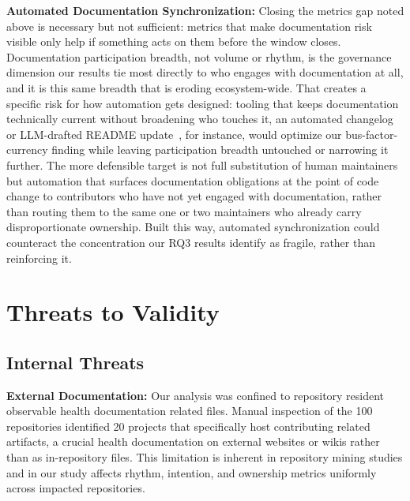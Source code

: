 \documentclass[10pt,conference]{IEEEtran}
\begin{document}
{{\noindent \textbf{Automated Documentation Synchronization:} Closing the metrics gap noted above is necessary but not sufficient: metrics that make documentation risk visible only help if something acts on them before the window closes. Documentation participation breadth, not volume or rhythm, is the governance dimension our results tie most directly to who engages with documentation at all, and it is this same breadth that is eroding ecosystem-wide. That creates a specific risk for how automation gets designed: tooling that keeps documentation technically current without broadening who touches it, an automated changelog or LLM-drafted README update~\cite{adejumo2026bridging,adejumo2024towards}, for instance, would optimize our bus-factor-currency finding while leaving participation breadth untouched or narrowing it further. The more defensible target is not full substitution of human maintainers but automation that surfaces documentation obligations at the point of code change to contributors who have not yet engaged with documentation, rather than routing them to the same one or two maintainers who already carry disproportionate ownership. Built this way, automated synchronization could counteract the concentration our RQ3 results identify as fragile, rather than reinforcing it.


\section{Threats to Validity}
\label{sec:Threats_to_Validity}

\subsection{Internal Threats}
\textbf{External Documentation:}
Our analysis was confined to repository resident observable health documentation related files. Manual inspection of the 100 repositories identified 20 projects that specifically host contributing related artifacts, a crucial health documentation on external websites or wikis rather than as in-repository files. This limitation is inherent in repository mining studies and in our study affects rhythm, intention, and ownership metrics uniformly across impacted repositories.


}}
\end{document}
